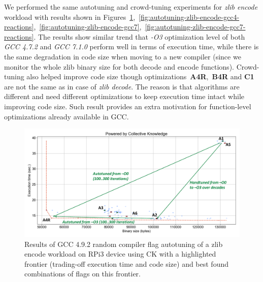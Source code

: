 We performed the same autotuning and crowd-tuning experiments for \textit{zlib encode} workload
with results shown in Figures~\ref{fig:autotuning-zlib-encode-gcc4},~\ref{fig:autotuning-zlib-encode-gcc4-reactions},~\ref{fig:autotuning-zlib-encode-gcc7},~\ref{fig:autotuning-zlib-encode-gcc7-reactions}.
%
The results show similar trend that \textit{-O3} optimization level of both \textit{GCC 4.7.2} and \textit{GCC 7.1.0} 
perform well in terms of execution time, while there is the same degradation in code size when moving to a new compiler
(since we monitor the whole zlib binary size for both decode and encode functions).
%
Crowd-tuning also helped improve code size though optimizations~\textbf{A4R},~\textbf{B4R} and \textbf{C1}
are not the same as in case of \textit{zlib decode}.
%
The reason is that algorithms are different and need different optimizations 
to keep execution time intact while improving code size.
%
Such result provides an extra motivation for function-level optimizations
already available in GCC.

   \begin{figure}[!htbp]
     \centering
      \includegraphics[width=5.2in]
      {ck-assets/269da4a48ecdfe46-cropped.pdf} %
      \vspace{0.1in}
      \vspace{0.1in}
     \caption{
      Results of GCC 4.9.2 random compiler flag autotuning of a zlib encode workload on RPi3
      device using CK with a highlighted frontier (trading-off execution time and code size) 
      and best found combinations of flags on this frontier.
     }
     \label{fig:autotuning-zlib-encode-gcc4}
   \end{figure}

